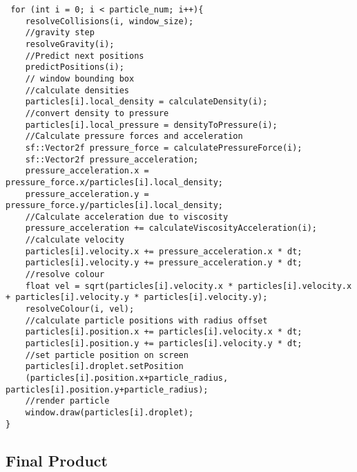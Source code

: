 \documentclass[write-up.tex]{subfiles}
\begin{document}
\begin{lstlisting}
 for (int i = 0; i < particle_num; i++){
    resolveCollisions(i, window_size);
    //gravity step
    resolveGravity(i);
    //Predict next positions
    predictPositions(i);
    // window bounding box
    //calculate densities
    particles[i].local_density = calculateDensity(i);
    //convert density to pressure
    particles[i].local_pressure = densityToPressure(i);
    //Calculate pressure forces and acceleration
    sf::Vector2f pressure_force = calculatePressureForce(i);
    sf::Vector2f pressure_acceleration;
    pressure_acceleration.x = pressure_force.x/particles[i].local_density;
    pressure_acceleration.y = pressure_force.y/particles[i].local_density;
    //Calculate acceleration due to viscosity
    pressure_acceleration += calculateViscosityAcceleration(i);
    //calculate velocity
    particles[i].velocity.x += pressure_acceleration.x * dt;
    particles[i].velocity.y += pressure_acceleration.y * dt;
    //resolve colour
    float vel = sqrt(particles[i].velocity.x * particles[i].velocity.x + particles[i].velocity.y * particles[i].velocity.y);
    resolveColour(i, vel);
    //calculate particle positions with radius offset
    particles[i].position.x += particles[i].velocity.x * dt;
    particles[i].position.y += particles[i].velocity.y * dt;
    //set particle position on screen
    particles[i].droplet.setPosition
    (particles[i].position.x+particle_radius, particles[i].position.y+particle_radius);
    //render particle
    window.draw(particles[i].droplet);
}
\end{lstlisting}
\subsection{Final Product}
\end{document}
